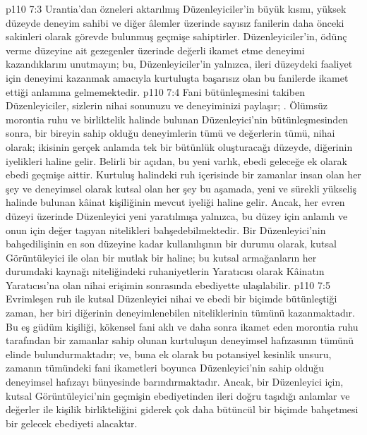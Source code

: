 \vs p110 7:3 Urantia’dan özneleri aktarılmış Düzenleyiciler’in büyük kısmı, yüksek düzeyde deneyim sahibi ve diğer âlemler üzerinde sayısız fanilerin daha önceki sakinleri olarak görevde bulunmuş geçmişe sahiptirler. Düzenleyiciler’in, ödünç verme düzeyine ait gezegenler üzerinde değerli ikamet etme deneyimi kazandıklarını unutmayın; bu, Düzenleyiciler’in yalnızca, ileri düzeydeki faaliyet için deneyimi kazanmak amacıyla kurtuluşta başarısız olan bu fanilerde ikamet ettiği anlamına gelmemektedir.
\vs p110 7:4 Fani bütünleşmesini takiben Düzenleyiciler, sizlerin nihai sonunuzu ve deneyiminizi paylaşır; . Ölümsüz morontia ruhu ve birliktelik halinde bulunan Düzenleyici’nin bütünleşmesinden sonra, bir bireyin sahip olduğu deneyimlerin tümü ve değerlerin tümü, nihai olarak; ikisinin gerçek anlamda tek bir bütünlük oluşturacağı düzeyde, diğerinin iyelikleri haline gelir. Belirli bir açıdan, bu yeni varlık, ebedi geleceğe ek olarak ebedi geçmişe aittir. Kurtuluş halindeki ruh içerisinde bir zamanlar insan olan her şey ve deneyimsel olarak kutsal olan her şey bu aşamada, yeni ve sürekli yükseliş halinde bulunan kâinat kişiliğinin mevcut iyeliği haline gelir. Ancak, her evren düzeyi üzerinde Düzenleyici yeni yaratılmışa yalnızca, bu düzey için anlamlı ve onun için değer taşıyan nitelikleri bahşedebilmektedir. Bir Düzenleyici’nin bahşedilişinin en son düzeyine kadar kullanılışının bir durumu olarak, kutsal Görüntüleyici ile olan bir mutlak bir  haline; bu kutsal armağanların her durumdaki kaynağı niteliğindeki ruhaniyetlerin Yaratıcısı olarak Kâinatın Yaratıcısı’na olan nihai erişimin sonrasında ebediyette ulaşılabilir.
\vs p110 7:5 Evrimleşen ruh ile kutsal Düzenleyici nihai ve ebedi bir biçimde bütünleştiği zaman, her biri diğerinin deneyimlenebilen niteliklerinin tümünü kazanmaktadır. Bu eş güdüm kişiliği, kökensel fani aklı ve daha sonra ikamet eden morontia ruhu tarafından bir zamanlar sahip olunan kurtuluşun deneyimsel hafızasının tümünü elinde bulundurmaktadır; ve, buna ek olarak bu potansiyel kesinlik unsuru, zamanın tümündeki fani ikametleri boyunca Düzenleyici’nin sahip olduğu deneyimsel hafızayı bünyesinde barındırmaktadır. Ancak, bir Düzenleyici için, kutsal Görüntüleyici’nin geçmişin ebediyetinden ileri doğru taşıdığı anlamlar ve değerler ile kişilik birlikteliğini giderek çok daha bütüncül bir biçimde bahşetmesi bir gelecek ebediyeti alacaktır.

